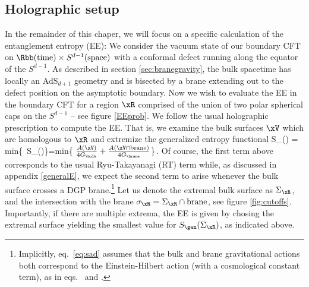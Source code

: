 \subsection{Holographic setup}
\label{sec:setupholo}
%
\begin{figure}
	\def\svgwidth{0.8\linewidth}
\end{figure}
%
In the remainder of this chaper, we will focus on a specific calculation of the entanglement entropy (EE): We consider the vacuum state of our boundary CFT on $\Rbb(\text{time})\times S^{d-1}(\text{space})$ with a conformal defect running along the equator of the $S^{d-1}$. As described in section \ref{sec:branegravity}, the bulk spacetime has locally an AdS$_{d+1}$ geometry and is bisected by a brane extending out to the defect position on the asymptotic boundary. Now we wish to evaluate the EE in the boundary CFT for a region $\xR$ comprised of the union of two polar spherical caps on the $S^{d-1}$ -- see figure \ref{EEprob}. We follow the usual holographic prescription to compute the EE. That is, we examine the bulk surfaces $\xV$ which are homologous to  $\xR$ and extremize the generalized entropy functional
\beq
 S_\EE(\xR) = {\rm min}\left\{\extr\,
 S_\gen(\xV)\right\}={\rm min}\left\{\extr
  \(
  \frac{A(\xV)}{4 G_\bulk} + \frac{A(\xV \cap {\rm brane})}{4 G_\brane}\)\right\}\,.
 \label{eq:sad}
\eeq
Of course, the first term above corresponds to the usual Ryu-Takayanagi (RT) term \cite{Ryu:2006bv,Ryu:2006ef} while, as discussed in appendix \ref{generalE}, we expect the second term to arise whenever the bulk surface crosses a DGP brane.\footnote{Implicitly, eq.~\eqref{eq:sad} assumes that the bulk and brane gravitational actions both correspond to the Einstein-Hilbert action (with a cosmological constant term), as in eqs.~ and .} Let us denote the extremal bulk surface as $\Sigma_\xR$, and the intersection with the brane $\sigma_\xR=\Sigma_\xR \cap {\rm brane}$, see figure \ref{fig:cutoffs}. Importantly, if there are multiple extrema, the EE is given by chosing the extremal surface yielding the smallest value for $S_\gen(\Sigma_\xR)$, as indicated above.


